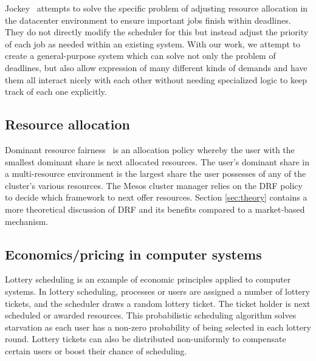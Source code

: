 \documentclass{acm_proc_article-sp}
\begin{document}
Jockey~\cite{jockey} attempts to solve the specific problem of adjusting
resource allocation in the datacenter environment to ensure important jobs
finish within deadlines. They do not directly modify the scheduler for this but
instead adjust the priority of each job as needed within an existing system.
With our work, we attempt to create a general-purpose system which can solve not
only the problem of deadlines, but also allow expression of many different kinds
of demands and have them all interact nicely with each other without needing
specialized logic to keep track of each one explicitly.

\subsection{Resource allocation}
Dominant resource fairness~\cite{drf} is an allocation policy whereby the user
with the smallest dominant share is next allocated resources. The user's
dominant share in a multi-resource environment is the largest share the user
possesses of any of the cluster's various resources. The Mesos cluster manager
relies on the DRF policy to decide which framework to next offer resources.
Section \ref{sec:theory} contains a more theoretical discussion of DRF and 
its benefits compared to a market-based mechanism.

\subsection{Economics/pricing in computer systems}
Lottery scheduling \cite{lottery} is an example of economic principles applied to computer systems. In lottery scheduling, processes or users are assigned a number of lottery tickets, and the scheduler draws a random lottery ticket. The ticket holder is next scheduled or awarded resources. This probabilistic scheduling algorithm solves starvation as each user has a non-zero probability of being selected in each lottery round. Lottery tickets can also be distributed non-uniformly to compensate certain users or boost their chance of scheduling.
\end{document}
